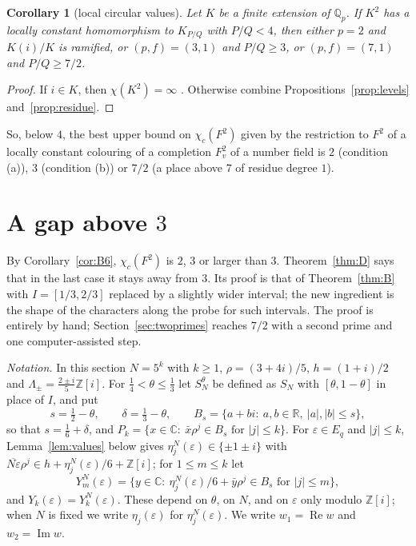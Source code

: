 \documentclass[11pt,a4paper]{amsart}
\newtheorem{corollary}{Corollary}
\theoremstyle{remark}
\newcommand{\Q}{\mathbb{Q}}
\newcommand{\R}{\mathbb{R}}
\newcommand{\Z}{\mathbb{Z}}
\newcommand{\C}{\mathbb{C}}
\begin{document}
\begin{corollary}[local circular values]\label{cor:localvalues}
Let $K$ be a finite extension of $\Q_p$. If $K^2$ has a locally constant homomorphism to $K_{P/Q}$ with $P/Q<4$, then
either $p=2$ and $K(i)/K$ is ramified, or $(p,f)=(3,1)$ and $P/Q\ge3$, or $(p,f)=(7,1)$ and $P/Q\ge7/2$.
\end{corollary}

\begin{proof}
If $i\in K$, then $\chi(K^2)=\infty$ \cite[Proposition~3]{PP}. Otherwise combine Propositions~\ref{prop:levels}
and~\ref{prop:residue}.
\end{proof}

So, below $4$, the best upper bound on $\chi_c(F^2)$ given by the restriction to $F^2$ of a locally constant colouring
of a completion $F_v^2$ of a number field is $2$ (condition (a)), $3$ (condition (b)) or $7/2$ (a place above $7$ of
residue degree $1$).

\section{A gap above \texorpdfstring{$3$}{3}}\label{sec:gap}

By Corollary~\ref{cor:B6}, $\chi_c(F^2)$ is $2$, $3$ or larger than $3$. Theorem~\ref{thm:D} says that in the last
case it stays away from $3$. Its proof is that of Theorem~\ref{thm:B} with $I=[1/3,2/3]$ replaced by a slightly
wider interval; the new ingredient is the shape of the characters along the probe for such intervals. The proof is
entirely by hand; Section~\ref{sec:twoprimes} reaches $7/2$ with a second prime and one computer-assisted step.

\emph{Notation.} In this section $N=5^k$ with $k\ge1$, $\rho=(3+4i)/5$, $h=(1+i)/2$ and
$\Lambda_\pm=\frac{2\pm i}5\Z[i]$. For $\frac14<\theta\le\frac13$ let $S_N^\theta$ be defined as $S_N$ with
$[\theta,1-\theta]$ in place of $I$, and put
\[
s=\tfrac12-\theta,\qquad\delta=\tfrac13-\theta,\qquad B_s=\{a+bi:\ a,b\in\R,\ |a|,|b|\le s\},
\]
so that $s=\frac16+\delta$, and $P_k=\{x\in\C:\ \bar x\rho^j\in B_s\text{ for }|j|\le k\}$. For $\varepsilon\in E_q$
and $|j|\le k$, Lemma~\ref{lem:values} below gives $\eta^N_j(\varepsilon)\in\{\pm1\pm i\}$ with
$\overline{N\varepsilon}\rho^j\in h+\eta^N_j(\varepsilon)/6+\Z[i]$; for $1\le m\le k$ let
\[
Y^N_m(\varepsilon)=\{y\in\C:\ \eta^N_j(\varepsilon)/6+\bar y\rho^j\in B_s\text{ for }|j|\le m\},
\]
and $Y_k(\varepsilon)=Y^N_k(\varepsilon)$. These depend on $\theta$, on $N$, and on $\varepsilon$ only modulo
$\Z[i]$; when $N$ is fixed we write $\eta_j(\varepsilon)$ for $\eta^N_j(\varepsilon)$. We write $w_1=\operatorname{Re}w$
and $w_2=\operatorname{Im}w$.
\end{document}
